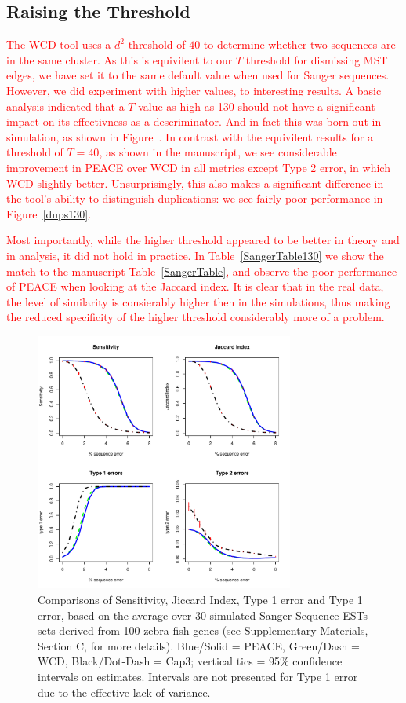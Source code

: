 \documentclass[a4paper,12pt]{article}
\newcommand{\mc}[1]{\textcolor{red}{#1}}
\newcommand{\peace} {{\small PEACE}}
\newcommand{\wcd} {{\small WCD}}
\newcommand{\capthree} {{\small Cap3}}
\begin{document}
\begin{appendix}
\subsection{Raising the Threshold}
\label{sim_thresh}
\mc{ 
  The \wcd\/ tool uses a $d^2$ threshold of $40$ to determine whether
  two sequences are in the same cluster.  As this is equivilent to our
  $T$ threshold for dismissing MST edges, we have set it to the same
  default value when used for Sanger sequences.  However, we did
  experiment with higher values, to interesting results.  A basic
  analysis indicated that a $T$ value as high as 130 should not have a
  significant impact on its effectivness as a descriminator.  And in
  fact this was born out in simulation, as shown in
  Figure~\label{SiJiT1T2130}.  In contrast with the equivilent results
  for a threshold of $T=40$, as shown in the manuscript, we see
  considerable improvement in \peace\/ over \wcd\/ in all metrics
  except Type 2 error, in which \wcd\/ slightly
  better. Unsurprisingly, this also makes a significant difference in
  the tool's ability to distinguish duplications: we see fairly poor
  performance in Figure~\ref{dups130}.  
}

\mc{
  Most importantly, while the higher threshold appeared to be better
  in theory and in analysis, it did not hold in practice.  In
  Table~\ref{SangerTable130} we show the match to the manuscript
  Table~\ref{SangerTable}, and observe the poor performance of
  \peace\/ when looking at the Jaccard index.  It is clear that in the
  real data, the level of similarity is consierably higher then in the
  simulations, thus making the reduced specificity of the higher
  threshold considerably more of a problem.
}


\begin{figure}
  \centerline{\includegraphics[width=3.35in]{pics.d/SeJiT1T2x40.pdf}}
  \caption{Comparisons of Sensitivity, Jiccard Index, Type 1 error and
    Type 1 error, based on the
    average over 30 simulated Sanger Sequence ESTs sets derived from 100 zebra
    fish genes  (see
    Supplementary Materials, Section C, for more details).  Blue/Solid
    = \peace, Green/Dash = \wcd, Black/Dot-Dash = \capthree; vertical
    tics = 95\% confidence intervals on estimates.  Intervals are not
    presented for Type 1 error due to the effective lack of
    variance.}\label{SeJiT1T2130}
\end{figure}


\end{appendix}
\end{document}
